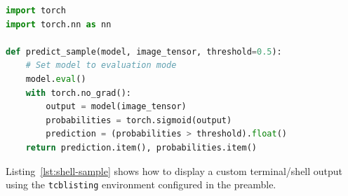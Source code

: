 \begin{lstlisting}[language=Python, caption={Sample Python Inference Function}, label={lst:python-sample}]
import torch
import torch.nn as nn

def predict_sample(model, image_tensor, threshold=0.5):
    # Set model to evaluation mode
    model.eval()
    with torch.no_grad():
        output = model(image_tensor)
        probabilities = torch.sigmoid(output)
        prediction = (probabilities > threshold).float()
    return prediction.item(), probabilities.item()
\end{lstlisting}

Listing~\ref{lst:shell-sample} shows how to display a custom terminal/shell output using the \texttt{tcblisting} environment configured in the preamble.

